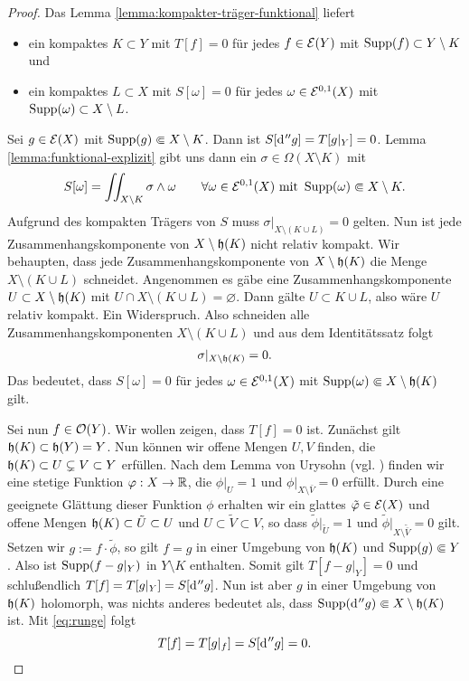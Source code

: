 \begin{proof}
  Das Lemma \ref{lemma:kompakter-träger-funktional} liefert
  \begin{itemize}
  \item ein kompaktes $K \subset Y$ mit $T[f] = 0$ für jedes $f \in
    \mathcal{E}(Y)$ mit $\operatorname{Supp}(f) \subset Y \setminus K$ und
  \item ein kompaktes $L \subset X$ mit $S[\omega] = 0$ für jedes
    $\omega \in \mathcal{E}^{0,1}(X)$ mit $\operatorname{Supp}(\omega) \subset X\setminus L$.
  \end{itemize}
   Sei $g \in \mathcal{E}(X)$ mit $\operatorname{Supp}(g) \Subset X \setminus K$. Dann ist
   $S[\d[''g]] = T[g|_Y]  = 0$. Lemma \ref{lemma:funktional-explizit}
   gibt uns dann ein $\sigma \in \Omega(X\setminus K)$ mit
   \[
   S[\omega] = \iint_{X \setminus K}\sigma \wedge \omega \qquad
   \forall \omega \in \mathcal{E}^{0,1}(X) \text{ mit } \operatorname{Supp}(\omega)
   \Subset X\setminus K.
   \]
   Aufgrund des kompakten Trägers von $S$ muss $\sigma|_{X \setminus
     (K \cup L)} = 0$ gelten. 
   Nun ist jede Zusammenhangskomponente von $X \setminus \mathfrak{h}(K)$
   nicht relativ kompakt. 
   Wir behaupten, dass jede Zusammenhangskomponente von $X \setminus
   \mathfrak{h}(K)$ die Menge $X \setminus (K \cup L)$ schneidet.
   Angenommen es gäbe eine Zusammenhangskomponente $U \subset X
   \setminus \mathfrak{h}(K)$ mit $U \cap X \setminus ( K \cup L) =
   \varnothing$. Dann gälte $U \subset K \cup L$, also wäre $U$ relativ
   kompakt. Ein Widerspruch. Also schneiden alle
   Zusammenhangskomponenten $X \setminus (K \cup L)$ und aus dem
   Identitätssatz folgt
   \begin{align}
   \sigma|_{X \setminus \mathfrak{h}(K)} = 0. \label{eq:runge}
   \end{align}
   Das bedeutet, dass $S[\omega] = 0$ für jedes $\omega \in
   \mathcal{E}^{0,1}(X)$ mit $\operatorname{Supp}(\omega) \Subset X \setminus
   \mathfrak{h}(K)$ gilt.

   Sei nun $f \in \mathcal{O}(Y)$. Wir wollen zeigen, dass $T[f] = 0$ ist. 
   Zunächst gilt $\mathfrak{h}(K) \subset \mathfrak{h}(Y) = Y$. Nun können wir
   offene Mengen $U, V$ finden, die $ \mathfrak{h}(K) \subset U
   \subsetneq V \subset Y$ erfüllen. Nach dem Lemma von Urysohn
   (vgl. \cite[Satz 12.2]{Jam}) finden
   wir eine stetige Funktion $\varphi: X \rightarrow \mathbb{R}$, die $\phi|_U = 1$
   und $\phi|_{X \setminus \bar V} = 0$ erfüllt. Durch eine geeignete Glättung
   dieser Funktion $\phi$ erhalten wir ein glattes $\tilde {\varphi} \in
   \mathcal{E}(X)$ und offene Mengen $\mathfrak{h}(K) \subset \tilde U \subset U$
   und $U \subset \tilde V \subset V$, so dass $\tilde \phi|_{\tilde
     U} = 1$ und $\tilde \phi|_{X \setminus \tilde {\bar V}} =
   0$ gilt. Setzen wir $ g := f \cdot \tilde \phi$, so gilt
   $f = g$ in einer Umgebung von $\mathfrak{h}(K)$ und $\operatorname{Supp}(g) \Subset Y$.
   Also ist $\operatorname{Supp}(f - g|_Y)$ in $Y \setminus K$ enthalten. Somit gilt $T[f- g|_Y] = 0$
   und schlußendlich $T[f] = T[g|_Y] = S[\d[''g]]$. 
   Nun ist aber $g$ in einer Umgebung von $\mathfrak{h}(K)$ holomorph, was
   nichts anderes bedeutet als, dass $\Supp(\d[''g]) \Subset X \setminus
   \runge(K)$ ist.
   Mit \eqref{eq:runge} folgt
   \[
   T[f] = T[g|_f] = S[\d[''g]] = 0.
   \]
\end{proof}

